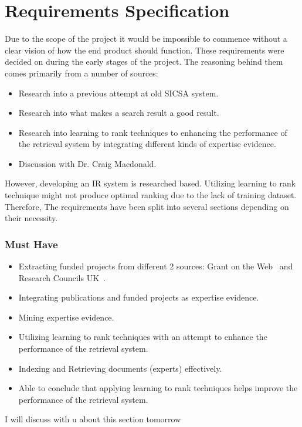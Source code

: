 
\section{Requirements Specification}\label{section:requirements}
Due to the scope of the project it would be impossible to commence without a clear vision of how
the end product should function. These requirements were decided on during the early stages of the project. 
The reasoning behind them comes primarily from a number of sources:
\begin{itemize}
 \item Research into a previous attempt at old SICSA system.
 \item Research into what makes a search result a good result.
 \item Research into learning to rank techniques to enhancing the performance of the retrieval system by integrating different kinds of expertise evidence.
 \item Discussion with Dr. Craig Macdonald.
\end{itemize}
However, developing an IR system is researched based. Utilizing learning to rank technique might not 
produce optimal ranking due to the lack of training dataset. Therefore, The requirements have been split into several sections depending on their 
necessity.

\subsubsection{Must Have}
\begin{itemize}
 \item Extracting funded projects from different 2 sources: Grant on the Web~\cite{gow} and Research Councils UK~\cite{gtr}.
 \item Integrating publications and funded projects as expertise evidence.
 \item Mining expertise evidence.
 \item Utilizing learning to rank techniques with an attempt to enhance the performance of the retrieval system.
 \item Indexing and Retrieving documents (experts) effectively.
 \item Able to conclude that applying learning to rank techniques helps improve the performance of the retrieval system. 
\end{itemize}

I will discuss with u about this section tomorrow

